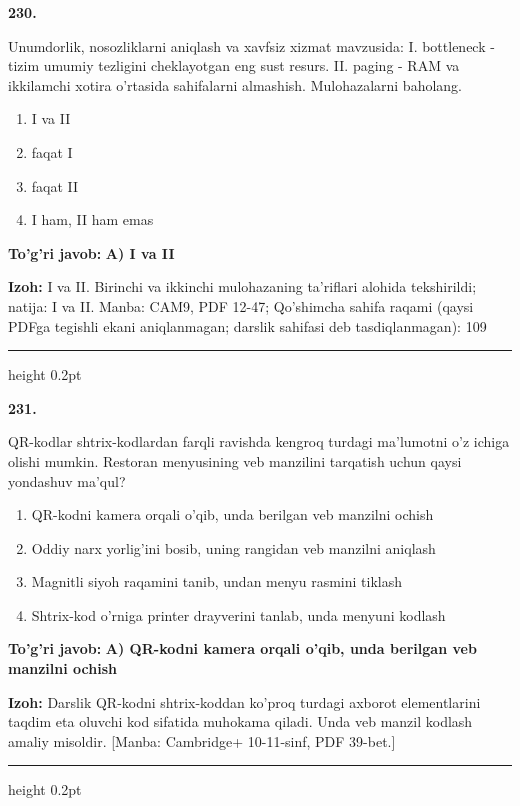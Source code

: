 \documentclass[10pt,a4paper]{article}
\begin{document}
{\bfseries\sffamily\color{ink} 230.}
\par
Unumdorlik, nosozliklarni aniqlash va xavfsiz xizmat mavzusida: I. bottleneck - tizim umumiy tezligini cheklayotgan eng sust resurs. II. paging - RAM va ikkilamchi xotira o'rtasida sahifalarni almashish. Mulohazalarni baholang.
\begin{enumerate}[label=\Alph*),leftmargin=9mm]
\item I va II
\item faqat I
\item faqat II
\item I ham, II ham emas
\end{enumerate}
\begin{tcolorbox}[enhanced,breakable,colback=teal!4,colframe=teal!60!black,boxrule=0.45pt,arc=1.2mm,left=2.7mm,right=2.7mm,top=1.8mm,bottom=1.8mm,before skip=2mm,after skip=2mm]
{\bfseries\sffamily\color{teal}To'g'ri javob:} \textbf{A) I va II}
\par\smallskip
{\bfseries Izoh:} I va II. Birinchi va ikkinchi mulohazaning ta'riflari alohida tekshirildi; natija: I va II. Manba: CAM9, PDF 12-47; Qo'shimcha sahifa raqami (qaysi PDFga tegishli ekani aniqlanmagan; darslik sahifasi deb tasdiqlanmagan): 109
\end{tcolorbox}
\vspace{2mm}\hrule height 0.2pt\vspace{3mm}

{\bfseries\sffamily\color{ink} 231.}
\par
QR-kodlar shtrix-kodlardan farqli ravishda kengroq turdagi ma'lumotni o'z ichiga olishi mumkin. Restoran menyusining veb manzilini tarqatish uchun qaysi yondashuv ma'qul?
\begin{enumerate}[label=\Alph*),leftmargin=9mm]
\item QR-kodni kamera orqali o'qib, unda berilgan veb manzilni ochish
\item Oddiy narx yorlig'ini bosib, uning rangidan veb manzilni aniqlash
\item Magnitli siyoh raqamini tanib, undan menyu rasmini tiklash
\item Shtrix-kod o'rniga printer drayverini tanlab, unda menyuni kodlash
\end{enumerate}
\begin{tcolorbox}[enhanced,breakable,colback=teal!4,colframe=teal!60!black,boxrule=0.45pt,arc=1.2mm,left=2.7mm,right=2.7mm,top=1.8mm,bottom=1.8mm,before skip=2mm,after skip=2mm]
{\bfseries\sffamily\color{teal}To'g'ri javob:} \textbf{A) QR-kodni kamera orqali o'qib, unda berilgan veb manzilni ochish}
\par\smallskip
{\bfseries Izoh:} Darslik QR-kodni shtrix-koddan ko'proq turdagi axborot elementlarini taqdim eta oluvchi kod sifatida muhokama qiladi. Unda veb manzil kodlash amaliy misoldir. [Manba: Cambridge+ 10-11-sinf, PDF 39-bet.]
\end{tcolorbox}
\vspace{2mm}\hrule height 0.2pt\vspace{3mm}
\end{document}
